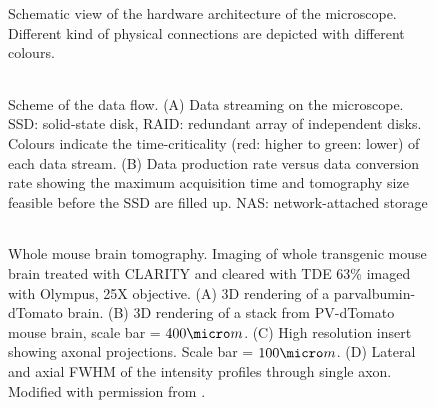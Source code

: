 \documentclass[12pt]{spieman}  %
\begin{document}
\begin{spacing}{2}
\begin{figure}
   \begin{center}
   \begin{tabular}{c}
   \end{tabular}
   \end{center}
   \caption{\label{fig:connectivity} Schematic view of the hardware architecture of the microscope. Different kind of physical connections are depicted with different colours.} 
   \end{figure}
	
\begin{figure}
   \begin{center}
   \begin{tabular}{c}
   \end{tabular}
   \end{center}
   \caption{\label{fig:DataFlow} Scheme of the data flow. (A) Data streaming on the microscope. SSD: solid-state disk, RAID: redundant array of independent disks. Colours indicate the time-criticality (red: higher to green: lower) of each data stream. (B) Data production rate versus data conversion rate showing the maximum acquisition time and tomography size feasible before the SSD are filled up. NAS: network-attached storage} 
   \end{figure}	

\begin{figure}
   \begin{center}
   \begin{tabular}{c}
   \end{tabular}
   \end{center}
   \caption{\label{fig:LSMdata} Whole mouse brain tomography. Imaging of whole transgenic mouse brain treated with CLARITY and cleared with TDE 63\% imaged with Olympus, 25X objective. (A) 3D rendering of a parvalbumin-dTomato brain. (B) 3D rendering of a stack from PV-dTomato mouse brain, scale bar = $400 \micro m$. (C) High resolution insert showing axonal projections. Scale bar = $100 \micro m$. (D) Lateral and axial FWHM of the intensity profiles through single axon. Modified with permission from \cite{Costantini}.} 
   \end{figure}
	

\end{spacing}
\end{document}

